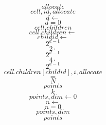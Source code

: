 \documentclass{scrreprt}
\begin{document}
\begin{equation}
allocate
\end{equation}
\begin{equation}
cell, id, allocate
\end{equation}
\begin{equation}
d \gets 
\end{equation}
\begin{equation}
d = 0
\end{equation}
\begin{equation}
cell.children
\end{equation}
\begin{equation}
cell.children \gets 
\end{equation}
\begin{equation}
childid \gets 
\end{equation}
\begin{equation}
2^{d-1}
\end{equation}
\begin{equation}
2\cdot
\end{equation}
\begin{equation}
2^{d-1}
\end{equation}
\begin{equation}
4\cdot
\end{equation}
\begin{equation}
2^{d-1}
\end{equation}
\begin{equation}
cell.children[childid], i, allocate
\end{equation}
\begin{equation}
=
\end{equation}
\begin{equation}
N
\end{equation}
\begin{equation}
points
\end{equation}
\begin{equation}
k
\end{equation}
\begin{equation}
points, dim\gets0
\end{equation}
\begin{equation}
n\gets
\end{equation}
\begin{equation}
n=0
\end{equation}
\begin{equation}
points, dim
\end{equation}
\begin{equation}
points
\end{equation}
\end{document}
